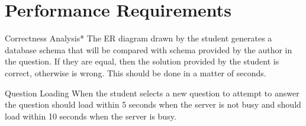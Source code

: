 \chapter{Performance Requirements}

    \begin{section}{Correctness Analysis*}
    The ER diagram drawn by the student generates a database schema that will be compared with schema provided by the author in the question. If they are equal, then the solution provided by the student is correct, otherwise is wrong. This should be done in a matter of seconds.
    \end{section}
    
    \begin{section}{Question Loading}
    When the student selects a new question to attempt to answer the question should load within 5 seconds when the server is not busy and should load within 10 seconds when the server is busy.
    \end{section}
    


